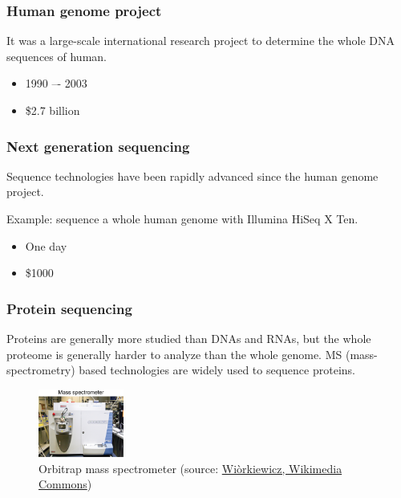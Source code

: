 %
%
\subsubsection*{Human genome project}
It was a large-scale international research project to determine the whole DNA sequences of human.

\begin{itemize}
\item 1990 –- 2003
\item \$2.7 billion
\end{itemize}

%
%
\subsubsection*{Next generation sequencing}
Sequence technologies have been rapidly advanced since the human genome project.

Example: sequence a whole human genome with Illumina HiSeq X Ten.
\begin{itemize}
\item One day
\item \$1000
\end{itemize}

%
%
\subsubsection*{Protein sequencing}
Proteins are generally more studied than DNAs and RNAs, but the whole proteome is generally harder to analyze than the whole genome. MS (mass-spectrometry) based technologies are widely used to sequence proteins.

\begin{figure}[H]
  \centering
      \includegraphics[width=0.25\textwidth]{fig01/mass_spectrometer.png}
  \caption{Orbitrap mass spectrometer (source: \href{https://commons.wikimedia.org/w/index.php?curid=18691799}{Wi\`{o}rkiewicz, Wikimedia Commons})}
\end{figure}
 
%
